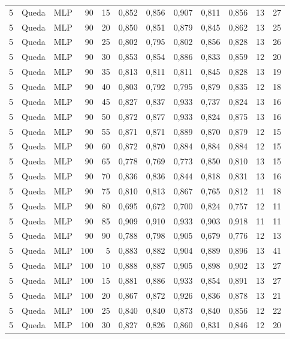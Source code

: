 \begin{longtable}{@{}rllrrrrrrrrr@{}}
5 & Queda & MLP & 90 & 15 & 0,852 & 0,856 & 0,907 & 0,811 & 0,856 & 13 & 27 \\
5 & Queda & MLP & 90 & 20 & 0,850 & 0,851 & 0,879 & 0,845 & 0,862 & 13 & 25 \\
5 & Queda & MLP & 90 & 25 & 0,802 & 0,795 & 0,802 & 0,856 & 0,828 & 13 & 26 \\
5 & Queda & MLP & 90 & 30 & 0,853 & 0,854 & 0,886 & 0,833 & 0,859 & 12 & 20 \\
5 & Queda & MLP & 90 & 35 & 0,813 & 0,811 & 0,811 & 0,845 & 0,828 & 13 & 19 \\
5 & Queda & MLP & 90 & 40 & 0,803 & 0,792 & 0,795 & 0,879 & 0,835 & 12 & 18 \\
5 & Queda & MLP & 90 & 45 & 0,827 & 0,837 & 0,933 & 0,737 & 0,824 & 13 & 16 \\
5 & Queda & MLP & 90 & 50 & 0,872 & 0,877 & 0,933 & 0,824 & 0,875 & 13 & 16 \\
5 & Queda & MLP & 90 & 55 & 0,871 & 0,871 & 0,889 & 0,870 & 0,879 & 12 & 15 \\
5 & Queda & MLP & 90 & 60 & 0,872 & 0,870 & 0,884 & 0,884 & 0,884 & 12 & 15 \\
5 & Queda & MLP & 90 & 65 & 0,778 & 0,769 & 0,773 & 0,850 & 0,810 & 13 & 15 \\
5 & Queda & MLP & 90 & 70 & 0,836 & 0,836 & 0,844 & 0,818 & 0,831 & 13 & 16 \\
5 & Queda & MLP & 90 & 75 & 0,810 & 0,813 & 0,867 & 0,765 & 0,812 & 11 & 18 \\
5 & Queda & MLP & 90 & 80 & 0,695 & 0,672 & 0,700 & 0,824 & 0,757 & 12 & 11 \\
5 & Queda & MLP & 90 & 85 & 0,909 & 0,910 & 0,933 & 0,903 & 0,918 & 11 & 11 \\
5 & Queda & MLP & 90 & 90 & 0,788 & 0,798 & 0,905 & 0,679 & 0,776 & 12 & 13 \\
5 & Queda & MLP & 100 & 5 & 0,883 & 0,882 & 0,904 & 0,889 & 0,896 & 13 & 41 \\
5 & Queda & MLP & 100 & 10 & 0,888 & 0,887 & 0,905 & 0,898 & 0,902 & 13 & 27 \\
5 & Queda & MLP & 100 & 15 & 0,881 & 0,886 & 0,933 & 0,854 & 0,891 & 13 & 27 \\
5 & Queda & MLP & 100 & 20 & 0,867 & 0,872 & 0,926 & 0,836 & 0,878 & 13 & 21 \\
5 & Queda & MLP & 100 & 25 & 0,840 & 0,840 & 0,873 & 0,840 & 0,856 & 12 & 22 \\
5 & Queda & MLP & 100 & 30 & 0,827 & 0,826 & 0,860 & 0,831 & 0,846 & 12 & 20 \\

\end{longtable}
